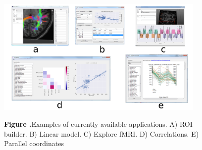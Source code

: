 \documentclass[utf8]{frontiersSCNS} %
\begin{document}
\begin{figure}[h!]
\begin{center}
\includegraphics[width=0.9\textwidth]{figures/many_apps.png}
\end{center}
 \textbf{\label{fig_other_apps} Figure .}{Examples of currently available applications. A) ROI builder. B) Linear model. C) Explore fMRI. D) Correlations. E) Parallel coordinates}
\end{figure}
\end{document}
